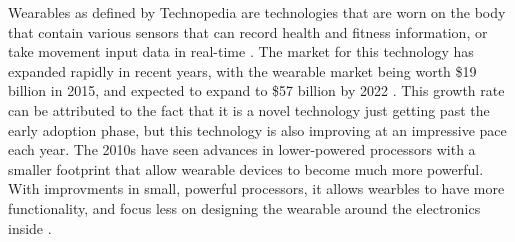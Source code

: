 Wearables as defined by Technopedia are technologies that are worn on
the body that contain various sensors that can record health and fitness
information, or take movement input data in real-time \cite{technopedia_defn}.
The market for this technology has expanded rapidly in recent years, with the
wearable market being worth \$19 billion in 2015, and expected to expand to \$57 billion
by 2022 \cite{market_growth}. This growth rate can be attributed to the fact that it is a novel
technology just getting past the early adoption phase, but this technology is also improving
at an impressive pace each year. The 2010s have seen advances in lower-powered processors with 
a smaller footprint that allow wearable devices to become much more powerful. With improvments in
small, powerful processors, it allows wearbles to have more functionality, and focus less on
designing the wearable around the electronics inside \cite{wearable_rev}.